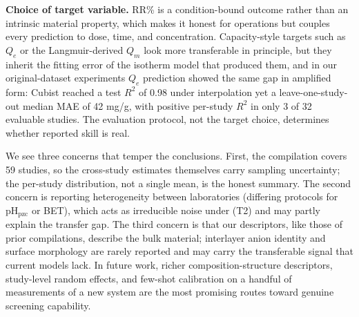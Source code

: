 \textbf{Choice of target variable.} RR\% is a condition-bound outcome
rather than an intrinsic material property, which makes it honest for
operations but couples every prediction to dose, time, and
concentration. Capacity-style targets such as $Q_e$ or the
Langmuir-derived $Q_m$ look more transferable in principle, but they
inherit the fitting error of the isotherm model that produced them, and
in our original-dataset experiments $Q_e$ prediction showed the same
gap in amplified form: Cubist reached a test $R^2$ of 0.98 under
interpolation yet a leave-one-study-out median MAE of 42 mg/g, with
positive per-study $R^2$ in only 3 of 32 evaluable studies. The evaluation protocol, not
the target choice, determines whether reported skill is real.

We see three concerns that temper the conclusions. First, the
compilation covers 59 studies, so the cross-study estimates themselves
carry sampling uncertainty; the per-study distribution, not a single
mean, is the honest summary. The second concern is reporting
heterogeneity between laboratories (differing protocols for
pH$_{\mathrm{pzc}}$ or BET), which acts as irreducible noise under (T2)
and may partly explain the transfer gap. The third concern is that our
descriptors, like those of prior compilations, describe the bulk
material; interlayer anion identity and surface morphology are rarely
reported and may carry the transferable signal that current models lack.
In future work, richer composition-structure descriptors, study-level
random effects, and few-shot calibration on a handful of measurements of
a new system are the most promising routes toward genuine screening
capability.
